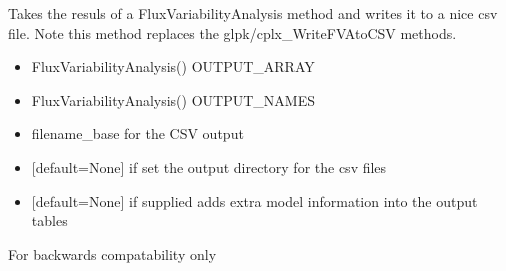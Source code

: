 \documentclass[letterpaper,10pt,english]{sphinxmanual}
\begin{document}

\begin{fulllineitems}
\label{\detokenize{modules_doc:cbmpy.CBWrite.writeFVAtoCSV}}
\pysigstartsignatures
{}
\pysigstopsignatures
\sphinxAtStartPar
Takes the resuls of a FluxVariabilityAnalysis method and writes it to a nice
csv file. Note this method replaces the glpk/cplx\_WriteFVAtoCSV methods.
\begin{itemize}
\item {} 
\sphinxAtStartPar
{} FluxVariabilityAnalysis() OUTPUT\_ARRAY

\item {} 
\sphinxAtStartPar
{} FluxVariabilityAnalysis() OUTPUT\_NAMES

\item {} 
\sphinxAtStartPar
{} filename\_base for the CSV output

\item {} 
\sphinxAtStartPar
{} {[}default=None{]} if set the output directory for the csv files

\item {} 
\sphinxAtStartPar
{} {[}default=None{]} if supplied adds extra model information into the output tables

\end{itemize}

\end{fulllineitems}


\begin{fulllineitems}
\label{\detokenize{modules_doc:cbmpy.CBWrite.writeMinDistanceLPwithCost}}
\pysigstartsignatures
{}
\pysigstopsignatures
\sphinxAtStartPar
For backwards compatability only

\end{fulllineitems}
\end{document}
